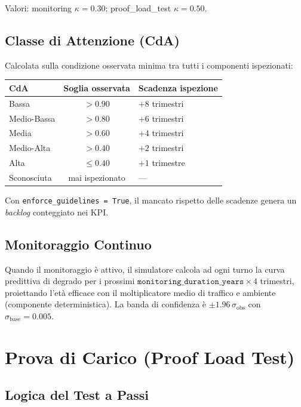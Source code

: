 \documentclass[11pt,a4paper]{article}
\begin{document}
Valori: monitoring $\kappa = 0.30$; proof\_load\_test $\kappa = 0.50$.

\subsection{Classe di Attenzione (CdA)}

Calcolata sulla condizione osservata minima tra tutti i componenti ispezionati:

\begin{center}
\begin{tabular}{lcl}
\toprule
\textbf{CdA} & \textbf{Soglia osservata} & \textbf{Scadenza ispezione} \\
\midrule
Bassa       & $> 0.90$ & $+8$ trimestri \\
Medio-Bassa & $> 0.80$ & $+6$ trimestri \\
Media       & $> 0.60$ & $+4$ trimestri \\
Medio-Alta  & $> 0.40$ & $+2$ trimestri \\
Alta        & $\leq 0.40$ & $+1$ trimestre \\
Sconosciuta & mai ispezionato & --- \\
\bottomrule
\end{tabular}
\end{center}

Con \texttt{enforce\_guidelines = True}, il mancato rispetto delle scadenze genera un \textit{backlog} conteggiato nei KPI.

\subsection{Monitoraggio Continuo}

Quando il monitoraggio \`e attivo, il simulatore calcola ad ogni turno la curva predittiva di degrado per i prossimi $\texttt{monitoring\_duration\_years} \times 4$ trimestri, proiettando l'et\`a efficace con il moltiplicatore medio di traffico e ambiente (componente deterministica). La banda di confidenza \`e $\pm 1.96\,\sigma_{\text{obs}}$ con $\sigma_{\text{base}} = 0.005$.

\section{Prova di Carico (Proof Load Test)}

\subsection{Logica del Test a Passi}
\end{document}
